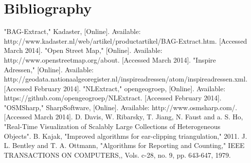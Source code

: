 \chapter{Bibliography}
\begingroup
\renewcommand{\chapter}[2]{}%
\begin{thebibliography}{}
"BAG-Extract," Kadaster, [Online]. Available: http://www.kadaster.nl/web/artikel/productartikel/BAG-Extract.htm. [Accessed March 2014].
"Open Street Map," [Online]. Available: http://www.openstreetmap.org/about. [Accessed March 2014].
"Inspire Adressen," [Online]. Available: http://geodata.nationaalgeoregister.nl/inspireadressen/atom/inspireadressen.xml. [Accessed February 2014].
"NLExtract," opengeogroep, [Online]. Available: https://github.com/opengeogroep/NLExtract. [Accessed February 2014].
"OSMSharp," SharpSoftware, [Online]. Available: http://www.osmsharp.com/. [Accessed March 2014].
D. Davis, W. Ribarsky, T. Jiang, N. Faust and a. S. Ho, "Real-Time Visualization of Scalably Large Collections of Heterogeneous Objects".
B. Kajak, "Improved algorithms for ear-clipping triangulation," 2011.
J. L. Bentley and T. A. Ottmann, "Algorithms for Reporting and Counting," IEEE TRANSACTIONS ON COMPUTERS,, Vols. c-28, no. 9, pp. 643-647, 1979.
\end{thebibliography}
\endgroup
